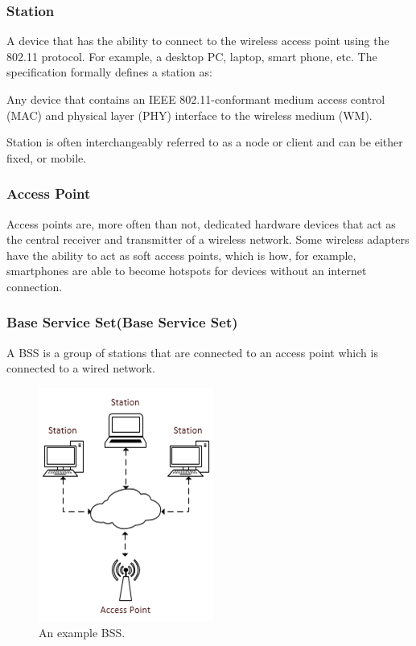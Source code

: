 \subsubsection*{Station}
A device that has the ability to connect to the wireless access point using the 802.11 protocol. For example, a desktop PC, laptop, smart phone, etc. The specification formally defines a station as:

\begin{center}
\quote Any device that contains an IEEE 802.11-conformant medium access control (MAC) and physical layer (PHY) interface to the wireless medium (WM).
\end{center}

Station is often interchangeably referred to as a node or client and can be either fixed, or mobile.

\subsubsection*{Access Point}
Access points are, more often than not, dedicated hardware devices that act as the central receiver and transmitter of a wireless network. Some wireless adapters have the ability to act as soft access points, which is how, for example, smartphones are able to become hotspots for devices without an internet connection.

\subsubsection*{Base Service Set(Base Service Set)}
A BSS is a group of stations that are connected to an access point which is connected to a wired network.

\begin{figure}[htb!]

\centering\includegraphics{intro/diagrams/bss.png}
\caption{An example BSS.}

\end{figure}
\newpage

